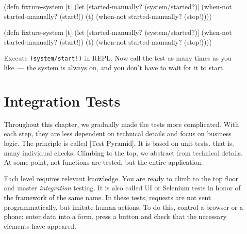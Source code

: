 \ifx\DEVICETYPE\MOBILE

\begin{english}
  \begin{clojure}
(defn fixture-system [t]
  (let [started-manually?
        (system/started?)]
    (when-not started-manually?
      (start!))
    (t)
    (when-not started-manually?
      (stop!))))
  \end{clojure}
\end{english}

\else

\begin{english}
  \begin{clojure}
(defn fixture-system [t]
  (let [started-manually? (system/started?)]
    (when-not started-manually?
      (start!))
    (t)
    (when-not started-manually?
      (stop!))))
  \end{clojure}
\end{english}

\fi

Execute \verb|(system/start!)| in REPL. Now call the test as many times as you like~--- the system is always on, and you don't have to wait for it to start.

\section{Integration Tests}


Throughout this chapter, we gradually made the tests more complicated. With each step, they are less dependent on technical details and focus on business logic. The principle is called [Test Pyramid]. It is based on unit tests, that is, many individual checks. Climbing to the top, we abstract from technical details. At some point, not functions are tested, but the entire application.


Each level requires relevant knowledge. You are ready to climb to the top floor and master \emph{integration} testing. It is also called UI or Selenium tests in honor of the framework of the same name. In these tests, requests are not sent programmatically, but imitate human actions. To do this, control a browser or a phone: enter data into a form, press a button and check that the necessary elements have appeared.


